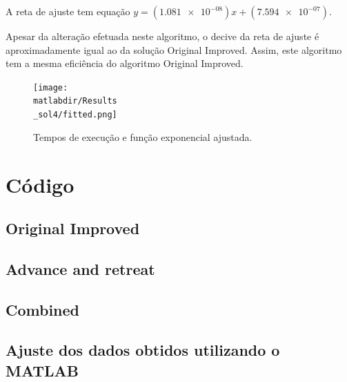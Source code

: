 \documentclass[portuguese,11pt,a4paper,titlepage]{article}
\newcommand{\srcdir}{..}
\newcommand{\matlabdir}{"../MATLAB-fittings"}
\begin{document}
A reta de ajuste tem equação \begin{math}y=(\num{1.081e-08})x+(\num{7.594e-07})\end{math}.

Apesar da alteração efetuada neste algoritmo, o decive da reta de ajuste é aproximadamente igual ao da
solução Original Improved. Assim, este algoritmo tem a mesma eficiência do algoritmo Original Improved.

\begin{figure}[h]
	\centering
	\texttt{[image: \\matlabdir/Results\\\_sol4/fitted.png]}
	\caption{Tempos de execução e função exponencial ajustada.}
	\label{fig:sol4}
\end{figure}
\pagebreak

\section{Código}
\subsection{Original Improved}

\pagebreak
\subsection{Advance and retreat}

\pagebreak
\subsection{Combined}

\pagebreak
\subsection{Ajuste dos dados obtidos utilizando o MATLAB}

\end{document}
